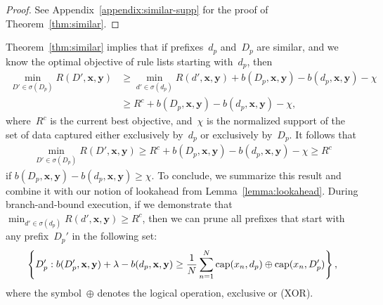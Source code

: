 \documentclass[twoside,11pt]{article}
\newcommand{\x}{\mathbf{x}}
\newcommand{\y}{\mathbf{y}}
\def\RL{{d}}
\def\Prefix{d_p}
\def\RLB{{D}}
\def\PrefixB{D_p}
\def\Obj{R}
\def\Reg{{\lambda}}
\def\Cap{\textnormal{cap}}
\def\CurrentObj{{R^c}}
\def\StartsWith{\sigma}
\newcommand{\nn}{\nonumber}
\begin{document}
\begin{arxiv}
\begin{proof}
See Appendix~\ref{appendix:similar-supp} for the proof of Theorem~\ref{thm:similar}.
\end{proof}

Theorem~\ref{thm:similar} implies that if prefixes~$\Prefix$
and~$\PrefixB$ are similar, and we know the optimal objective
of rule lists starting with~$\Prefix$, then
\begin{align}
\min_{\RLB' \in \StartsWith(\PrefixB)} \Obj(\RLB', \x, \y)
&\ge \min_{\RL' \in \StartsWith(\Prefix)} \Obj(\RL', \x, \y)
+ b(\PrefixB, \x, \y) - b(\Prefix, \x, \y) - \chi \nn \\
&\ge \CurrentObj + b(\PrefixB, \x, \y) - b(\Prefix, \x, \y) - \chi, \nn
\end{align}
where~$\CurrentObj$ is the current best objective,
and~$\chi$ is the normalized support of the set of data captured
either exclusively by~$\Prefix$ or exclusively by~$\PrefixB$.
%
It follows that
\begin{align}
\min_{\RLB' \in \StartsWith(\PrefixB)} \Obj(\RLB', \x, \y)
\ge \CurrentObj + b(\PrefixB, \x, \y) - b(\Prefix, \x, \y) - \chi \ge \CurrentObj \nn
\end{align}
if ${b(\PrefixB, \x, \y) - b(\Prefix, \x, \y) \ge \chi}$.
%
To conclude, we summarize this result and combine it with
our notion of lookahead from Lemma~\ref{lemma:lookahead}.
%
During branch-and-bound execution, if we demonstrate that
${\min_{\RL' \in \StartsWith(\Prefix)} \Obj(\RL', \x, \y) \ge \CurrentObj}$,
then we can prune all prefixes that start with any
prefix~$\PrefixB'$ in the following set:
\begin{align}
\left\{ \PrefixB' : b(\PrefixB', \x, \y) + \Reg - b(\Prefix, \x, \y) \ge
\frac{1}{N} \sum_{n=1}^N \Cap(x_n, \Prefix) \oplus \Cap(x_n, \PrefixB') \right\}, \nn
\end{align}
where the symbol~$\oplus$ denotes the logical operation, exclusive or (XOR).


\end{arxiv}
\end{document}
